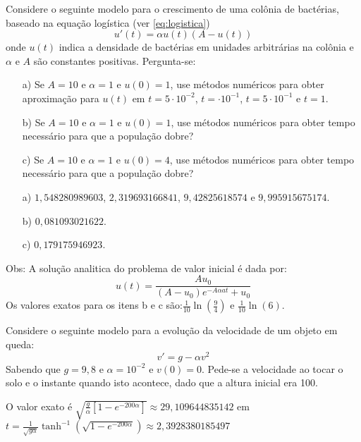 \begin{exer} Considere o seguinte modelo para o crescimento de uma colônia de bactérias, baseado na equação logística (ver \eqref{eq:logistica})
\begin{equation} u'(t)=\alpha u(t) \left(A-u(t)\right) \end{equation}
onde $u(t)$ indica a densidade de bactérias em unidades arbitrárias na colônia e $\alpha$ e $A$ são constantes positivas.
Pergunta-se: %
\begin{itemize}
\item[a)] Se $A=10$ e $\alpha=1$ e $u(0)=1$, use métodos numéricos para obter aproximação para $u(t)$ em $t=5\cdot 10^{-2}$, $t=\cdot 10^{-1}$, $t=5\cdot 10^{-1}$ e $t=1$.
\item[b)] Se $A=10$ e $\alpha=1$ e $u(0)=1$, use métodos numéricos para obter tempo necessário para que a população dobre?
\item[c)] Se $A=10$ e $\alpha=1$ e $u(0)=4$, use métodos numéricos para obter tempo necessário para que a população dobre?
\end{itemize}
\end{exer}
\begin{resp}
\begin{itemize}
 \item [a)] $1,548280989603$,   $2,319693166841$,    $9,42825618574$ e  $9,995915675174$.
 \item [b)] $0,081093021622$.
 \item [c)] $0,179175946923$.
 \end{itemize}

Obs: A solução analitica do problema de valor inicial é dada por:
 \begin{equation} u(t)=\frac{Au_0}{(A-u_0)e^{-A\alpha at}+u_0} \end{equation}
 Os valores exatos para os itens b e c são:$\frac{1}{10}\ln\left(\frac{9}{4}\right)$ e $\frac{1}{10}\ln\left(6\right)$.

\end{resp}

\begin{exer} Considere o seguinte modelo para a evolução da velocidade de um objeto em queda:
\begin{equation} v'=g-\alpha v^2 \end{equation}
Sabendo que $g=9,8$ e $\alpha=10^{-2}$ e $v(0)=0$. Pede-se a velocidade ao tocar o solo e o instante quando isto acontece, dado que a altura inicial era 100.
\end{exer}
\begin{resp}
O valor exato é $\sqrt{\frac{g}{\alpha}\left[1-e^{{-200\alpha}}\right]}\approx 29,109644835142$ em $t=\frac{1}{\sqrt{g\alpha}}\tanh^{-1}\left(\sqrt{1-e^{{-200\alpha}}}\right)\approx 2,3928380185497$
\end{resp}



